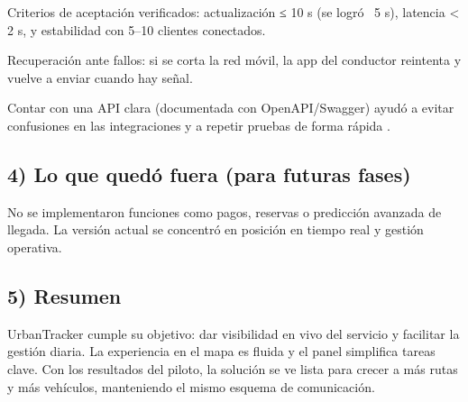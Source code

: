 Criterios de aceptación verificados: actualización ≤ 10 s (se logró ~5 s), latencia < 2 s, y estabilidad con 5–10 clientes conectados.

Recuperación ante fallos: si se corta la red móvil, la app del conductor reintenta y vuelve a enviar cuando hay señal.

Contar con una API clara (documentada con OpenAPI/Swagger) ayudó a evitar confusiones en las integraciones y a repetir pruebas de forma rápida \cite{easyrest2022}.

\subsection{4) Lo que quedó fuera (para futuras fases)}
No se implementaron funciones como pagos, reservas o predicción avanzada de llegada. La versión actual se concentró en posición en tiempo real y gestión operativa.

\subsection{5) Resumen}
UrbanTracker cumple su objetivo: dar visibilidad en vivo del servicio y facilitar la gestión diaria. La experiencia en el mapa es fluida y el panel simplifica tareas clave. Con los resultados del piloto, la solución se ve lista para crecer a más rutas y más vehículos, manteniendo el mismo esquema de comunicación.